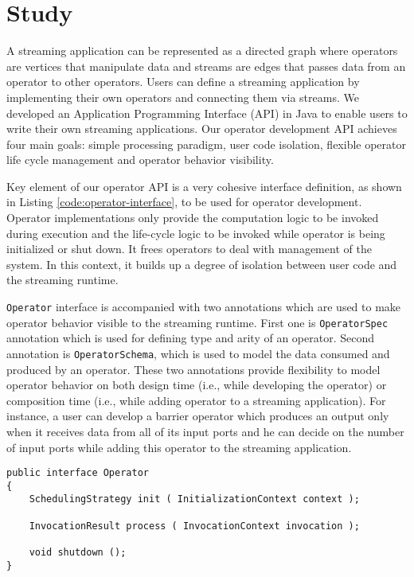 \section{Study}\label{sec:study}


A streaming application can be represented as a directed graph where operators are vertices that manipulate data and streams are edges that passes data from an operator to other operators. Users can define a streaming application by implementing their own operators and connecting them via streams. We developed an Application Programming Interface (API) in Java to enable users to write their own streaming applications. Our operator development API achieves four main goals: simple processing paradigm, user code isolation, flexible operator life cycle management and operator behavior visibility. 

Key element of our operator API is a very cohesive interface definition, as shown in Listing \ref{code:operator-interface}, to be used for operator development. Operator implementations only provide the computation logic to be invoked during execution and the life-cycle logic to be invoked while operator is being initialized or shut down. It frees operators to deal with management of the system. In this context, it builds up a degree of isolation between user code and the streaming runtime.

\texttt{Operator} interface is accompanied with two annotations which are used to make operator behavior visible to the streaming runtime. First one is \texttt{OperatorSpec} annotation which is used for defining type and arity of an operator. Second annotation is \texttt{OperatorSchema}, which is used to model the data consumed and produced by an operator. These two annotations provide flexibility to model operator behavior on both design time (i.e., while developing the operator) or composition time (i.e., while adding operator to a streaming application). For instance, a user can develop a barrier operator which produces an output only when it receives data from all of its input ports and he can decide on the number of input ports while adding this operator to the streaming application. 
\lstset{language=JAVA, caption="Operator Interface"}
\begin{lstlisting}[frame=single] 
public interface Operator
{
    SchedulingStrategy init ( InitializationContext context );
	
    InvocationResult process ( InvocationContext invocation );

    void shutdown ();
}
\end{lstlisting}
\label{code:operator-interface}


